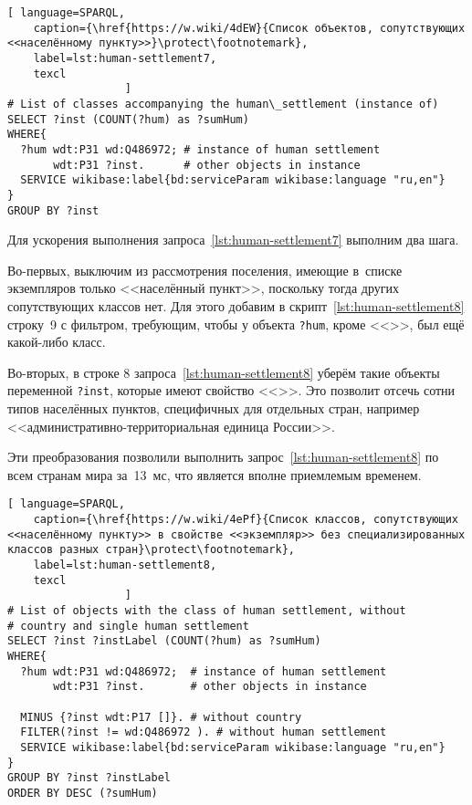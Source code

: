 \begin{lstlisting}[ language=SPARQL, 
    caption={\href{https://w.wiki/4dEW}{Cписок объектов, сопутствующих <<населённому пункту>>}\protect\footnotemark},
    label=lst:human-settlement7,
    texcl 
                  ]
# List of classes accompanying the human\_settlement (instance of)
SELECT ?inst (COUNT(?hum) as ?sumHum) 
WHERE{          
  ?hum wdt:P31 wd:Q486972; # instance of human settlement
       wdt:P31 ?inst.      # other objects in instance
  SERVICE wikibase:label{bd:serviceParam wikibase:language "ru,en"}
}  
GROUP BY ?inst
\end{lstlisting}%

Для ускорения выполнения запроса~\ref{lst:human-settlement7} выполним два шага.
 
Во-первых, выключим из рассмотрения поселения, 
имеющие в~списке экземпляров только <<населённый пункт>>, 
поскольку тогда других сопутствующих классов нет. 
Для этого добавим в скрипт~\ref{lst:human-settlement8} строку~\num{9} с фильтром, 
требующим, чтобы у объекта \lstinline|?hum|, 
кроме  <<>>, был ещё какой-либо класс.

Во-вторых, в строке \num{8} запроса~\ref{lst:human-settlement8} 
уберём такие объекты переменной \lstinline|?inst|, 
которые имеют свойство <<>>. 
Это позволит отсечь сотни типов населённых пунктов, специфичных для отдельных стран, 
например <<административно-территориальная единица России>>.

Эти преобразования позволили выполнить запрос~\ref{lst:human-settlement8} 
по всем странам мира за~13~мс, что является вполне приемлемым временем.


\newpage
\lstset{numbers=left, firstnumber=1, frame=single}
\begin{lstlisting}[ language=SPARQL, 
    caption={\href{https://w.wiki/4ePf}{Cписок классов, сопутствующих <<населённому пункту>> в свойстве <<экземпляр>> без специализированных классов разных стран}\protect\footnotemark},
    label=lst:human-settlement8,
    texcl 
                  ]
# List of objects with the class of human settlement, without 
# country and single human settlement
SELECT ?inst ?instLabel (COUNT(?hum) as ?sumHum) 
WHERE{ 
  ?hum wdt:P31 wd:Q486972;  # instance of human settlement
       wdt:P31 ?inst.       # other objects in instance
  
  MINUS {?inst wdt:P17 []}. # without country
  FILTER(?inst != wd:Q486972 ). # without human settlement
  SERVICE wikibase:label{bd:serviceParam wikibase:language "ru,en"}
}  
GROUP BY ?inst ?instLabel
ORDER BY DESC (?sumHum)
\end{lstlisting}%

